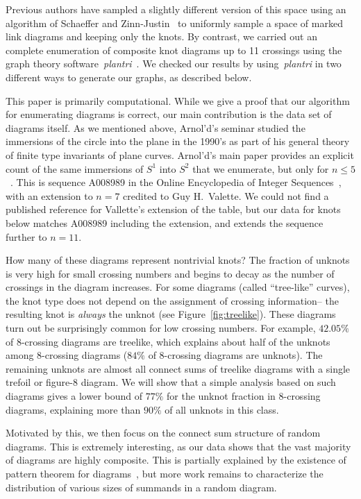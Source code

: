 \documentclass[amsmath,secnumarabic,floatfix,amssymb,nofootinbib,nobibnotes,letterpaper,11pt,tightenlines,showkeys]{revtex4}
\theoremstyle{definition}
\begin{document}
Previous authors have sampled a slightly different version of this space using an algorithm of Schaeffer and Zinn-Justin~\cite{Schaeffer:2004tt} to uniformly sample a space of marked link diagrams and keeping only the knots. By contrast, we carried out an complete enumeration of composite knot diagrams up to 11 crossings using the graph theory software~\emph{plantri}~\cite{Brinkmann:2005um,Brinkmann:2007up}. We checked our results by using~\emph{plantri} in two different ways to generate our graphs, as described below.

This paper is primarily computational. While we give a proof that our algorithm for enumerating diagrams is correct, our main contribution is the data set of diagrams itself. As we mentioned above, Arnol'd's seminar studied the immersions of the circle into the plane in the 1990's as part of his general theory of finite type invariants of plane curves. Arnol'd's main paper provides an explicit count of the same immersions of $S^1$ into $S^2$ that we enumerate, but only for $n \leq 5$~\cite[page 79]{Arnold:1994wr}. This is sequence A008989 in the Online Encyclopedia of Integer Sequences~\cite{Untitled:vPCfHsyG}, with an extension to $n=7$ credited to Guy H.\ Valette. We could not find a published reference for Vallette's extension of the table, but our data for knots below matches A008989 including the extension, and extends the sequence further to $n=11$.

How many of these diagrams represent nontrivial knots? The fraction of unknots is very high for small crossing numbers and begins to decay as the number of crossings in the diagram increases.  For some diagrams (called ``tree-like'' curves), the knot type does not depend on the assignment of crossing information-- the resulting knot is \emph{always} the unknot (see Figure~\ref{fig:treelike}). These diagrams turn out be surprisingly common for low crossing numbers. For example, $42.05\%$ of 8-crossing diagrams are treelike, which explains about half of the unknots among 8-crossing diagrams ($84\%$ of 8-crossing diagrams are unknots). The remaining unknots are almost all connect sums of treelike diagrams with a single trefoil or figure-8 diagram. We will show that a simple analysis based on such diagrams gives a lower bound of $77\%$ for the unknot fraction in 8-crossing diagrams, explaining more than $90\%$ of all unknots in this class. 

Motivated by this, we then focus on the connect sum structure of random diagrams. This is extremely interesting, as our data shows that the vast majority of diagrams are highly composite. This is partially explained by the existence of pattern theorem for diagrams~\cite{harrison}, but more work remains to characterize the distribution of various sizes of summands in a random diagram. 
\end{document}
